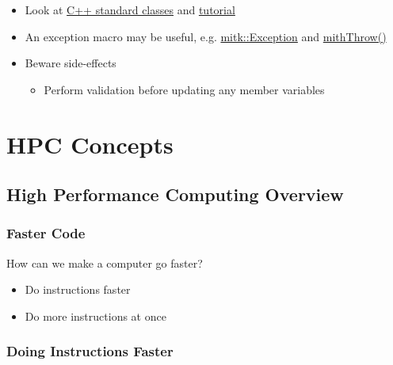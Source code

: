 \begin{itemize}
\itemsep1pt\parskip0pt
\item
  Look at \href{http://www.cplusplus.com/reference/exception/}{C++
  standard classes} and
  \href{http://www.cplusplus.com/doc/tutorial/exceptions/}{tutorial}
\item
  An exception macro may be useful, e.g.
  \href{https://github.com/MITK/MITK/blob/master/Modules/Core/include/mitkException.h}{mitk::Exception}
  and
  \href{https://github.com/MITK/MITK/blob/master/Modules/Core/include/mitkExceptionMacro.h}{mithThrow()}
\item
  Beware side-effects

  \begin{itemize}
  \itemsep1pt\parskip0pt
  \item
    Perform validation before updating any member variables
  \end{itemize}
\end{itemize}

\section{HPC Concepts}\label{hpc-concepts}

\subsection{High Performance Computing
Overview}\label{high-performance-computing-overview}

\subsubsection{Faster Code}\label{faster-code}

How can we make a computer go faster?

\begin{itemize}
\itemsep1pt\parskip0pt
\item
  Do instructions faster
\item
  Do more instructions at once
\end{itemize}

\subsubsection{Doing Instructions
Faster}\label{doing-instructions-faster}

